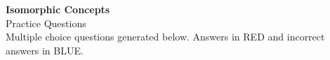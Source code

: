 \documentclass[11pt]{article}
\newcommand{\QuestionStyle}[1]{{\large\bfseries\boldmath #1}}
\newcommand{\AnswerStyle}[1]{{\large\bfseries\boldmath #1}}
\newcommand{\ReasonStyle}[1]{{\normalsize #1}}
\newif\ifshowreason
\newcommand{\Correct}[2]{%
  \item \AnswerStyle{\textcolor{AnsRed}{#1}}%
  \ifshowreason\\[-0.2em]
    \ReasonStyle{\textcolor{AnsRed}{#2}}%
  \fi
}
\newcommand{\Wrong}[2]{%
  \item \AnswerStyle{\textcolor{WrongBlue}{#1}}%
  \ifshowreason\\[-0.2em]
    \ReasonStyle{\textcolor{WrongBlue}{#2}}%
  \fi
}
\newcommand{\QBlock}[3]{%
  \Needspace{8\baselineskip}%
  \noindent
  \begin{minipage}{\linewidth}
    \QuestionStyle{#1.~#2}

    \vspace{0.25em}
    \begin{enumerate}
      #3
    \end{enumerate}

    \vspace{0.25em}
    \hrule height 0.4pt
  \end{minipage}
  \vspace{0.75em}
}
\begin{document}
\begin{center}
{\huge \textbf{Isomorphic Concepts}}\\[0.25em]
{\Large Practice Questions}\\[0.25em]
{\large Multiple choice questions generated below. Answers in RED and incorrect answers in BLUE.}
\end{center}

\vspace{0.75em}

\end{document}
